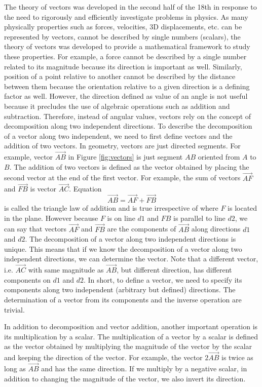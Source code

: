 \documentclass[12pt]{article}
\begin{document}
The theory of vectors was developed in the second half of the 18th in response to the need to rigorously and efficiently investigate problems in physics. As many physically properties such as forces, velocities, 3D displacements, etc. can be represented by vectors, cannot be described by single numbers (scalars), the theory of vectors was developed to provide a mathematical framework to study these properties. For example, a force cannot be described by a single number related to its magnitude because its direction is important as well. Similarly, position of a point relative to another cannot be described by the distance between them because the orientation relative to a given direction is a defining factor as well. However, the direction defined as value of an angle is not useful because it precludes the use of algebraic operations such as addition and subtraction. Therefore, instead of angular values, vectors rely on the concept of decomposition along two independent directions.  To describe the decomposition of a vector along two independent, we need to first define vectors and the addition of two vectors. In geometry, vectors are just directed segments.  For example, vector $\vec {AB}$ in Figure \ref{fig:vectors} is just segment $AB$ oriented from $A$ to $B$. The addition of two vectors is defined as the vector obtained by placing the second vector at the end of the first vector. For example, the sum of vectors $\vec {AF}$ and $\vec {FB}$ is vector $\vec {AC}$.  Equation 
\begin{equation}
\vec {AB}=\vec {AF} + \vec {FB}
\label{eq:vectorAddition}
\end{equation}
is called the triangle law of addition and is true irrespective of where $F$ is located in the plane. However because $F$ is on line $d1$ and $FB$ is parallel to line $d2$, we can say that vectors $\vec{AF}$ and $\vec{FB}$ are the components of $\vec{AB}$ along directions $d1$ and $d2$.  The decomposition of a vector along two independent directions is unique.  This means that if we know the decomposition of a vector along two independent directions, we can determine the vector.  Note that a different vector, i.e. $\vec{AC}$ with same magnitude as $\vec{AB}$, but different direction, has different components on $d1$ and $d2$. In short, to define a vector, we need to specify its components along two independent (arbitrary but defined) directions.  The determination of a vector from its components and the inverse operation are trivial.

In addition to decomposition and vector addition, another important operation is its multiplication by a scalar.  The multiplication of a vector by a scalar is defined as the vector obtained by multiplying the magnitude of the vector by the scalar and keeping the direction of the vector.  For example, the vector $2\vec{AB}$ is twice as long as $\vec{AB}$ and has the same direction.  If we multiply by a negative scalar, in addition to changing the magnitude of the vector, we also invert its direction. 
\end{document}
